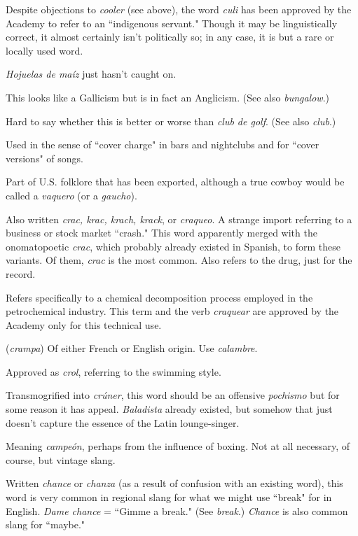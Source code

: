  Despite objections to \emph{cooler} (see above), the word
\emph{culi} has been approved by the Academy to refer to an ``indigenous servant." Though it may be linguistically correct, it almost certainly isn't
politically so; in any case, it is but a rare or locally used word.

 \emph{Hojuelas de maíz} just hasn't caught on.

 This looks like a Gallicism but is in fact an Anglicism. (See also \emph{bungalow}.)

 Hard to say whether this is better or worse
than \emph{club de golf}. (See also \emph{club}.)

 Used in the sense of ``cover charge" in bars and nightclubs and for ``cover versions" of songs.

 Part of U.S. folklore that has been exported, although a true cowboy would be called a \emph{vaquero} (or a \emph{gaucho}).

 Also written \emph{crac, krac, krach, krack}, or \emph{craqueo}. A
strange import referring to a business or stock market ``crash." This
word apparently merged with the onomatopoetic \emph{crac}, which probably
already existed in Spanish, to form these variants. Of them, \emph{crac} is the
most common. Also refers to the drug, just for the record.

 Refers specifically to a chemical decomposition
process employed in the petrochemical industry. This term and the
verb \emph{craquear} are approved by the Academy only for this technical use.

 (\emph{crampa}) Of either French or English origin. Use
\emph{calambre}.

 Approved as \emph{crol}, referring to the swimming style.

 Transmogrified into \emph{crúner}, this word should be
an offensive \emph{pochismo} but for some reason it has appeal. \emph{Baladista} already existed, but somehow that just doesn't capture the essence of the
Latin lounge-singer.

 Meaning \emph{campeón}, perhaps from the influence of
boxing. Not at all necessary, of course, but vintage slang.

 Written \emph{chance} or \emph{chanza} (as a result of confusion
with an existing word), this word is very common in regional slang for
what we might use ``break" for in English. \emph{Dame chance} = ``Gimme a
break." (See \emph{break}.) \emph{Chance} is also common slang for ``maybe."

